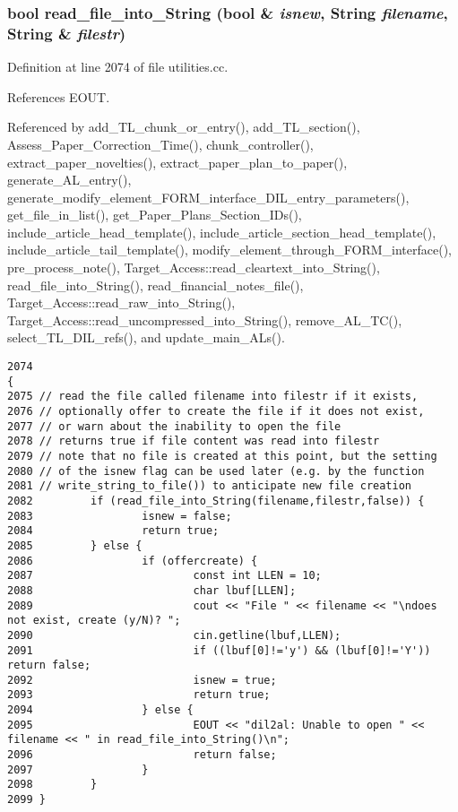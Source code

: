\subsubsection{\setlength{\rightskip}{0pt plus 5cm}bool read\_\-file\_\-into\_\-String (bool \& {\em isnew}, {\bf String} {\em filename}, {\bf String} \& {\em filestr})}\label{dil2al_8hh_a237}




Definition at line 2074 of file utilities.cc.

References EOUT.

Referenced by add\_\-TL\_\-chunk\_\-or\_\-entry(), add\_\-TL\_\-section(), Assess\_\-Paper\_\-Correction\_\-Time(), chunk\_\-controller(), extract\_\-paper\_\-novelties(), extract\_\-paper\_\-plan\_\-to\_\-paper(), generate\_\-AL\_\-entry(), generate\_\-modify\_\-element\_\-FORM\_\-interface\_\-DIL\_\-entry\_\-parameters(), get\_\-file\_\-in\_\-list(), get\_\-Paper\_\-Plans\_\-Section\_\-IDs(), include\_\-article\_\-head\_\-template(), include\_\-article\_\-section\_\-head\_\-template(), include\_\-article\_\-tail\_\-template(), modify\_\-element\_\-through\_\-FORM\_\-interface(), pre\_\-process\_\-note(), Target\_\-Access::read\_\-cleartext\_\-into\_\-String(), read\_\-file\_\-into\_\-String(), read\_\-financial\_\-notes\_\-file(), Target\_\-Access::read\_\-raw\_\-into\_\-String(), Target\_\-Access::read\_\-uncompressed\_\-into\_\-String(), remove\_\-AL\_\-TC(), select\_\-TL\_\-DIL\_\-refs(), and update\_\-main\_\-ALs().



\footnotesize\begin{verbatim}2074                                                                             {
2075 // read the file called filename into filestr if it exists,
2076 // optionally offer to create the file if it does not exist,
2077 // or warn about the inability to open the file
2078 // returns true if file content was read into filestr
2079 // note that no file is created at this point, but the setting
2080 // of the isnew flag can be used later (e.g. by the function
2081 // write_string_to_file()) to anticipate new file creation
2082         if (read_file_into_String(filename,filestr,false)) {
2083                 isnew = false;
2084                 return true;
2085         } else {
2086                 if (offercreate) {
2087                         const int LLEN = 10;
2088                         char lbuf[LLEN];
2089                         cout << "File " << filename << "\ndoes not exist, create (y/N)? ";
2090                         cin.getline(lbuf,LLEN);
2091                         if ((lbuf[0]!='y') && (lbuf[0]!='Y')) return false;
2092                         isnew = true;
2093                         return true;
2094                 } else {
2095                         EOUT << "dil2al: Unable to open " << filename << " in read_file_into_String()\n";
2096                         return false;
2097                 }
2098         }
2099 }
\end{verbatim}\normalsize 
{}
